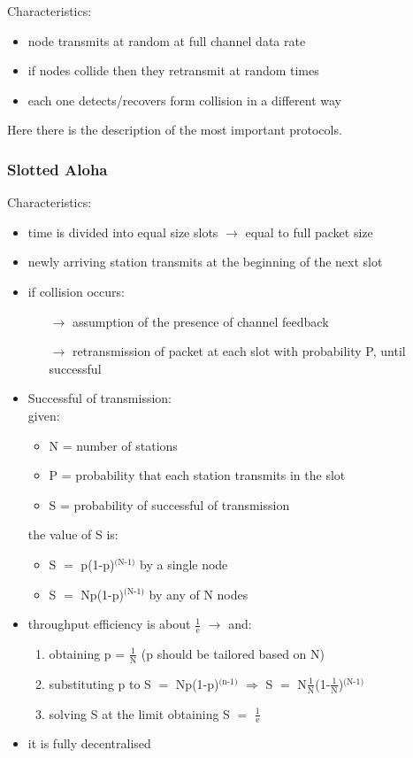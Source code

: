 Characteristics:
\begin{itemize}
    \item node transmits at random at full channel data rate
    \item if nodes collide then they retransmit at random times
    \item each one detects/recovers form collision in a different way
\end{itemize}
\vspace*{0.5cm}
Here there is the description of the most important protocols.

\subsubsection{Slotted Aloha}

Characteristics:
\begin{itemize}
    \item time is divided into equal size slots $\rightarrow$ equal to full packet size
    \item newly arriving station transmits at the beginning of the next slot
    \item if collision occurs:
    \begin{itemize}
        \item[$\rightarrow$] assumption of the presence of channel feedback
        \item[$\rightarrow$] retransmission of packet at each slot with probability P, until successful
        \end{itemize}
        \item Successful of transmission:\\[0.2cm]given:
        \begin{itemize}
            \item N = number of stations
            \item P = probability that each station transmits in the slot
            \item S = probability of successful of transmission
        \end{itemize}
        the value of S is:
        \begin{itemize}
            \item S $=$ p(1-p)$^{\text{(N-1)}}$ by a single node 
            \item S $=$ Np(1-p)$^{\text{(N-1)}}$ by any of N nodes
        \end{itemize}
    \item throughput efficiency is about $\frac{\text{1}}{\text{e}}$ $\rightarrow$
    and:
    \begin{enumerate}
        \item obtaining p = $\frac{\text{1}}{\text{N}}$ (p should be tailored based on N)
        \item substituting p to S $=$ Np(1-p)$^{\text{(n-1)}}$ $\Rightarrow$
        S $=$ N$\frac{\text{1}}{\text{N}}$(1-$\frac{\text{1}}{\text{N}}$)$^{\text{(N-1)}}$
        \item solving S at the limit obtaining S $=$ $\frac{\text{1}}{\text{e}}$
    \end{enumerate}
    \item it is fully decentralised
\end{itemize}
